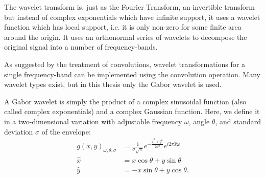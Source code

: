 The wavelet transform is, just as the Fourier Transform, an invertible transform but instead of complex exponentials which have infinite support, it uses a wavelet function which has local support, i.e. it is only non-zero for some finite area around the origin. It uses an orthonormal series of wavelets to decompose the original signal into a number of frequency-bands.

As suggested by the treatment of convolutions, wavelet transformations for a single frequency-band can be implemented using the convolution operation. Many wavelet types exist, but in this thesis only the Gabor wavelet is used.



A Gabor wavelet is simply the product of a complex sinusoidal function (also called complex exponentials) and a complex Gaussian function. Here, we define it in a two-dimensional variation with adjustable frequency $\omega$, angle $\theta$, and standard deviation $\sigma$ of the envelope:
\begin{align}
    g(x,y)_{\omega, \theta, \sigma} &= \frac{1}{\sigma\sqrt{\pi}} e^{-\frac{\hat{x}^2+\hat{y}^2}{2\sigma^2}} e^{i 2\pi \hat{x}\omega}\\
    \hat{x} &= x\cos\theta + y\sin\theta \\
    \hat{y} &= -x\sin\theta + y\cos\theta.
\end{align}





























